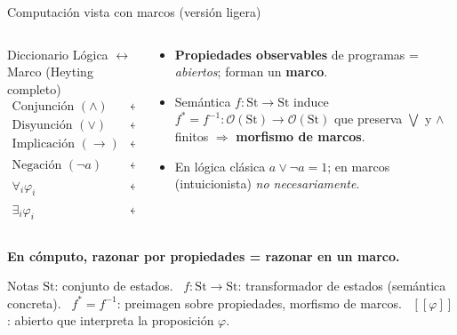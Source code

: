 \documentclass[compress,12pt]{beamer}
\newcommand{\den}[1]{[\![#1]\!]} %
\begin{document}
\begin{frame}[t]{Computación vista con marcos (versión ligera)}
\footnotesize
\begin{columns}[T,totalwidth=\textwidth]
  \begin{column}{0.58\textwidth}
    \begin{block}{Diccionario Lógica $\leftrightarrow$ Marco (Heyting completo)}
    \begingroup
      \setlength{\arraycolsep}{0.6em}
      \renewcommand{\arraystretch}{1.15}
      \[
      \begin{array}{rcl}
        \text{Conjunción }(\land) &\leftrightarrow& \wedge \quad(\text{ínfimo})\\[0.2em]
        \text{Disyunción }(\lor)  &\leftrightarrow& \vee \quad(\text{supremo})\\[0.2em]
        \text{Implicación }(\to)  &\leftrightarrow& a\Rightarrow b \\[0.2em]
        \text{Negación }(\neg a)  &\leftrightarrow& a^{*} := (a\Rightarrow 0)\\[0.2em]
        \forall_i \varphi_i       &\leftrightarrow& \bigwedge_i \den{\varphi_i}\\[0.2em]
        \exists_i \varphi_i       &\leftrightarrow& \bigvee_i \den{\varphi_i}
      \end{array}
      \]
    \endgroup
    \end{block}
  \end{column}
  \begin{column}{0.42\textwidth}
    \begin{itemize}\setlength{\itemsep}{2pt}
      \item \textbf{Propiedades observables} de programas = \emph{abiertos}; forman un \textbf{marco}.
      \item Semántica \(f:\mathrm{St}\to \mathrm{St}\) induce \(f^{*}=f^{-1}:\mathcal{O}(\mathrm{St})\to\mathcal{O}(\mathrm{St})\) que preserva \(\bigvee\) y \(\wedge\) finitos \(\Rightarrow\) \textbf{morfismo de marcos}.
      \item En lógica clásica \(a\vee \neg a=1\); en marcos (intuicionista) \emph{no necesariamente}.
    \end{itemize}
  \end{column}
\end{columns}

\vspace{0.6em}
\centering
\textcolor{blue!60!black}{\Large \textbf{En cómputo, razonar por propiedades = razonar en un marco.}}
\vspace{0.4em}
\begin{block}{\footnotesize Notas}
\scriptsize
\(\mathrm{St}\): conjunto de estados. \ 
\(f:\mathrm{St}\to\mathrm{St}\): transformador de estados (semántica concreta). \
\(f^{*}=f^{-1}\): preimagen sobre propiedades, morfismo de marcos. \
\(\den{\varphi}\): abierto que interpreta la proposición \(\varphi\).
\end{block}
\end{frame}
\end{document}
